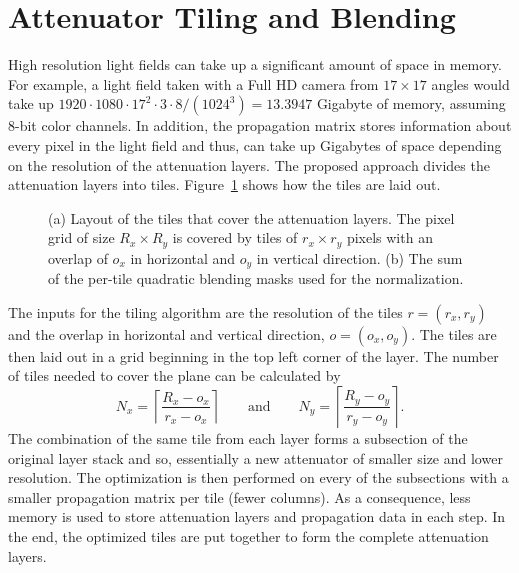 \section{Attenuator Tiling and Blending}
\label{sec:tiling_and_blending}

High resolution light fields can take up a significant amount of space in memory. 
For example, a light field taken with a Full HD camera from $17 \times 17$ angles would take up $1920 \cdot 1080 \cdot 17^2 \cdot 3 \cdot 8 / (1024^3) = 13.3947$ Gigabyte of memory, assuming \mbox{8-bit} color channels. 
In addition, the propagation matrix stores information about every pixel in the light field and thus, can take up Gigabytes of space depending on the resolution of the attenuation layers. 
The proposed approach divides the attenuation layers into tiles. 
Figure~\ref{fig:tiling_layout} shows how the tiles are laid out.
\begin{figure}[tb]
	\begin{subfigure}{0.5\textwidth}
		\centering
		
		\caption{}
		\label{fig:tiling_layout}
	\end{subfigure}%
	\begin{subfigure}{0.5\textwidth}
		\centering
		
		\caption{}
		\label{fig:sum_of_quadratic_blending_masks}
	\end{subfigure}%
	\caption[Tiling layout]
			{(a) Layout of the tiles that cover the attenuation layers.
				 The pixel grid of size $R_x \times R_y$ is covered by tiles of $r_x \times r_y$ pixels with an overlap of $o_x$ in horizontal and $o_y$ in vertical direction.
			 (b) The sum of the per-tile quadratic blending masks used for the normalization.}
\end{figure}
The inputs for the tiling algorithm are the resolution of the tiles $r = (r_x, r_y)$ and the overlap in horizontal and vertical direction, $o = (o_x, o_y)$. 
The tiles are then laid out in a grid beginning in the top left corner of the layer. 
The number of tiles needed to cover the plane can be calculated by 
\begin{equation}
	N_x = \left \lceil \dfrac{R_x - o_x}{r_x - o_x} \right \rceil
	\qquad 
	\text{and} 
	\qquad
	N_y = \left \lceil \dfrac{R_y - o_y}{r_y - o_y} \right \rceil.
\end{equation}
The combination of the same tile from each layer forms a subsection of the original layer stack and so, essentially a new attenuator of smaller size and lower resolution.
The optimization is then performed on every of the subsections with a smaller propagation matrix per tile (fewer columns). 
As a consequence, less memory is used to store attenuation layers and propagation data in each step.
In the end, the optimized tiles are put together to form the complete attenuation layers. 


